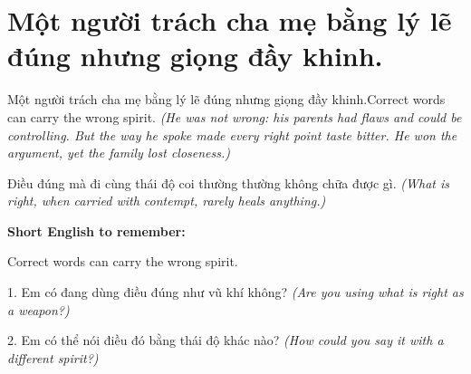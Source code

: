 \section{Một người trách cha mẹ bằng lý lẽ đúng nhưng giọng đầy khinh.}
\begin{truyen}{Một người trách cha mẹ bằng lý lẽ đúng nhưng giọng đầy khinh.}{Correct words can carry the wrong spirit.}
\textit{(He was not wrong: his parents had flaws and could be controlling. But the way he spoke made every right point taste bitter. He won the argument, yet the family lost closeness.)}
\end{truyen}
\begin{baihoc}
Điều đúng mà đi cùng thái độ coi thường thường không chữa được gì.
\textit{(What is right, when carried with contempt, rarely heals anything.)}
\end{baihoc}
\begin{ghinhoanh}\textbf{Short English to remember:}

Correct words can carry the wrong spirit.
\end{ghinhoanh}
\begin{tuhocnhanh}
1. Em có đang dùng điều đúng như vũ khí không? \textit{(Are you using what is right as a weapon?)}

2. Em có thể nói điều đó bằng thái độ khác nào? \textit{(How could you say it with a different spirit?)}
\end{tuhocnhanh}
\ngancach

